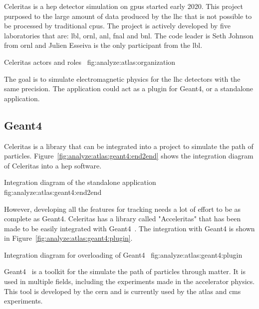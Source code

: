Celeritas is a \acrfull{hep} detector simulation on \acrshort{gpu}s started
early 2020.
This project purposed to the large amount of data produced by the
\acrfull{lhc} that is not possible to be processed by traditional
\acrshort{cpu}s.
The project is actively developed by five laboratories that are: \acrfull{lbl},
\acrfull{ornl}, \acrfull{anl}, \acrfull{fnal} and \acrfull{bnl}.
The code leader is Seth Johnson from \acrshort{ornl} and Julien Esseiva is the only
participant from the \acrshort{lbl}.

{Celeritas actors and roles~\cite{celeritas-presentation-johnson}}
{fig:analyze:atlas:organization}

The goal is to simulate electromagnetic physics for the \acrshort{lhc} detectors
with the same precision.
The application could act as a plugin for Geant4, or a standalone application.


\subsection{Geant4}
\label{ch:analyze:atlas:geant4}

Celeritas is a library that can be integrated into a project to simulate the path
of particles.
Figure~\ref{fig:analyze:atlas:geant4:end2end} shows the integration diagram of
Celeritas into a \acrshort{hep} software.

{Integration diagram of the standalone application~\cite{celeritas-overview-tognini}}
{fig:analyze:atlas:geant4:end2end}


However, developing all the features for tracking needs a lot of effort to be
as complete as Geant4.
Celeritas has a library called "Acceleritas" that has been made to be easily
integrated with Geant4~\cite{geant4}.
The integration with Geant4 is shown in Figure~\ref{fig:analyze:atlas:geant4:plugin}.

    {Integration diagram for overloading of Geant4~\cite{celeritas-overview-tognini}}
    {fig:analyze:atlas:geant4:plugin}

Geant4~\cite{geant4} is a toolkit for the simulate the path of particles through
matter.
It is used in multiple fields, including the experiments made in the
accelerator physics.
This tool is developed by the \acrfull{cern} and is currently used by the
\acrshort{atlas} and \acrshort{cms} experiments.



